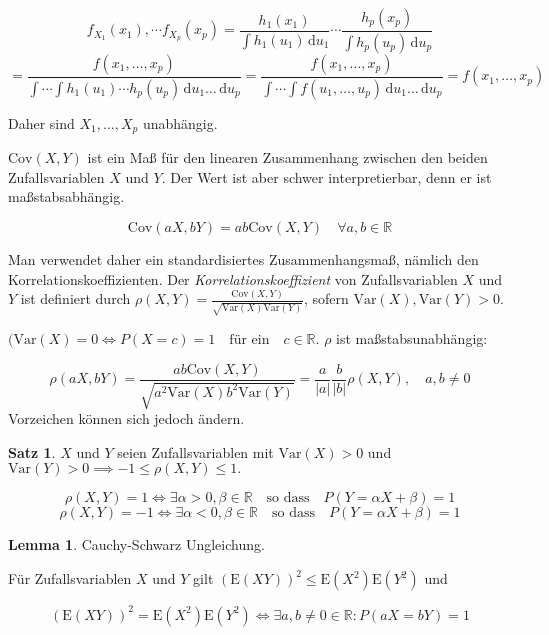 \documentclass[12pt, a4paper]{article}
\newcommand{\E}{\mbox{I\negthinspace E}}
\theoremstyle{plain}
\theoremstyle{definition}
\newtheorem{satz}[thm]{Satz}
\newtheorem{lemma}[thm]{Lemma}
\newcommand{\R}{\mathbb{R}}
\newcommand{\1}{\mathds{1}}
\renewcommand{\E}{\mathrm{E}}
\newcommand{\Var}{\mathrm{Var}}
\newcommand{\Cov}{\mathrm{Cov}}
\providecommand{\abs}[1]{\lvert#1\rvert}
\renewcommand{\d}{\,\mathrm{d}}
\providecommand{\mtext}[1]{\quad \text{#1} \quad}
\begin{document}
\[ f_{X_1} (x_1), \cdots f_{X_p} (x_p) = \frac{ h_1 (x_1)}{\int h_1 (u_1) \d u_1} \cdots   \frac{ h_p (x_p)}{\int h_p (u_p) \d u_p}       \]
\[  = \frac{f(x_1, \ldots, x_p)}{\int \cdots \int h_1 (u_1) \cdots h_p (u_p) \d u_1 \ldots \d u_p }  =   \frac{f(x_1, \ldots, x_p)}{\int \cdots \int f(u_1, \ldots, u_p) \d u_1 \ldots \d u_p }  = f(x_1, \ldots, x_p )  \]

Daher sind $X_1, \ldots, X_p$ unabhängig. 

\newpage

$\Cov (X,Y)$ ist ein Maß für den linearen Zusammenhang zwischen den beiden Zufallsvariablen $X$ und $Y$. Der Wert ist aber schwer interpretierbar, denn er ist maßstabsabhängig.

\[   \Cov(aX, bY) = ab \Cov(X,Y)\quad \forall a,b\in\R    \]

Man verwendet daher ein standardisiertes Zusammenhangsmaß, nämlich den Korrelationskoeffizienten. Der \emph{Korrelationskoeffizient} von Zufallsvariablen $X$ und $Y$ ist definiert durch $\rho (X,Y) = \frac{ \Cov(X,Y) }{\sqrt{\Var(X)\Var(Y)}}$, sofern $\Var(X), \Var(Y) > 0.$

$(\Var(X) = 0 \iff P(X=c)=1 \mtext{für ein} c\in\R$. $\rho$ ist maßstabsunabhängig:

\[ \rho(aX, bY) =   \frac{ab \Cov(X,Y) }{\sqrt{ a^2\Var(X) b^2 \Var(Y)}} = \frac{a}{\abs{a}} \frac{b}{\abs{b}} \rho(X,Y), \quad a,b \neq 0   \]
Vorzeichen können sich jedoch ändern.

\begin{satz} $X$ und $Y$ seien Zufallsvariablen mit $\Var(X)>0$ und $\Var(Y) > 0 \implies -1 \leq \rho(X,Y) \leq 1.$ \end{satz}

\[    \rho(X,Y) = 1 \iff \exists \alpha > 0, \beta\in\R \mtext{so dass} P(Y = \alpha X + \beta) = 1      \]
\[    \rho(X,Y) = -1 \iff \exists \alpha < 0, \beta\in\R \mtext{so dass} P(Y = \alpha X + \beta) = 1      \]

\begin{lemma} Cauchy-Schwarz Ungleichung. \end{lemma}

Für Zufallsvariablen $X$ und $Y$ gilt $(\E(XY))^2 \leq \E(X^2) \E(Y^2)$ und 

\[  (\E(XY))^2 = \E(X^2)\E(Y^2) \iff \exists a,b \neq 0 \in \R: P(aX=bY) = 1  \]
\end{document}
